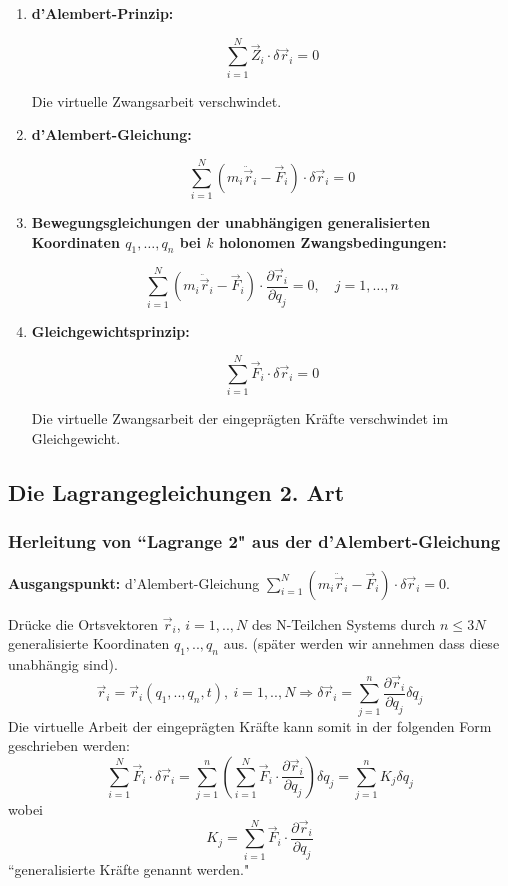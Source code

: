\documentclass[10pt, letterpaper]{article}
\begin{document}
\begin{enumerate}
    \item \textbf{d'Alembert-Prinzip:}
    
    $$
    \sum_{i=1}^N \vec{Z}_i \cdot \delta\vec{r}_i = 0
    $$
    
    Die virtuelle Zwangsarbeit verschwindet.

    \item \textbf{d'Alembert-Gleichung:}
    
    $$
    \sum_{i=1}^N (m_i \ddot{\vec{r}}_i - \vec{F}_i) \cdot \delta\vec{r}_i = 0
    $$

    \item \textbf{Bewegungsgleichungen der unabhängigen generalisierten Koordinaten \( q_1, \dots, q_n \) bei \( k \) holonomen Zwangsbedingungen:}
    
    $$
    \sum_{i=1}^N (m_i \ddot{\vec{r}}_i - \vec{F}_i) \cdot \frac{\partial\vec{r}_i}{\partial q_j} = 0,
    \quad j = 1, \dots, n
    $$

    \item \textbf{Gleichgewichtsprinzip:}
    
    $$
    \sum_{i=1}^N \vec{F}_i \cdot \delta\vec{r}_i = 0
    $$

    Die virtuelle Zwangsarbeit der eingeprägten Kräfte verschwindet im Gleichgewicht.
\end{enumerate}




\pagebreak


\subsection{Die Lagrangegleichungen 2. Art}


\subsubsection{Herleitung von ``Lagrange 2" aus der d'Alembert-Gleichung}



\textbf{Ausgangspunkt:} d'Alembert-Gleichung $\sum_{i=1}^N (m_i\ddot{\vec{r}}_i-\vec{F}_i)\cdot\delta\vec{r}_i = 0$.

Drücke die Ortsvektoren $\vec{r}_i$, $i=1,..,N$ des N-Teilchen Systems durch $n \leq 3N$ generalisierte Koordinaten $q_1,..,q_n$ aus.
(später werden wir annehmen dass diese unabhängig sind).
$$\vec{r}_i = \vec{r}_i(q_1,..,q_n,t),\ i=1,..,N \Rightarrow \delta\vec{r}_i = \sum_{j=1}^n \frac{\partial\vec{r}_i}{\partial q_j}\delta q_j$$
Die virtuelle Arbeit der eingeprägten Kräfte kann somit in der folgenden Form geschrieben werden:
$$\sum_{i=1}^N \vec{F}_i\cdot\delta\vec{r}_i = \sum_{j=1}^n\left(\sum_{i=1}^N \vec{F}_i\cdot\frac{\partial\vec{r}_i}{\partial q_j}\right)\delta q_j = \sum_{j=1}^n K_j\delta q_j$$
wobei
$$K_j = \sum_{i=1}^N \vec{F}_i\cdot\frac{\partial\vec{r}_i}{\partial q_j}$$ 
``generalisierte Kräfte genannt werden."
\end{document}
